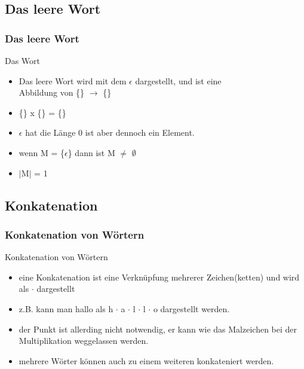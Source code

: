 \documentclass{beamer}
\begin{document}
\subsection{Das leere Wort}
\begin{frame}
	\frametitle{Das leere Wort}
	\begin{block}{Das Wort}
		\begin{itemize}
			\item Das leere Wort wird mit dem $\epsilon$ dargestellt, und ist eine \\
			Abbildung von \{\} $\rightarrow$ \{\} \\
			\item \{\} x \{\} = \{\} \\
			\item $\epsilon$ hat die Länge 0 ist aber dennoch ein Element. \\
			\item wenn M = \{$\epsilon$\} dann ist M $\not=$ $\emptyset$ \\
			\item $|$M$|$ = 1
		\end{itemize}
	\end{block}
\end{frame}

\subsection{Konkatenation}
\begin{frame}
	\frametitle{Konkatenation von Wörtern}
	\begin{block}{Konkatenation von Wörtern}
		\begin{itemize}
			\item eine Konkatenation ist eine Verknüpfung mehrerer Zeichen(ketten) 			und wird als $\cdot$ dargestellt \\
			\item z.B. kann man hallo als h $\cdot$ a $\cdot$ l $\cdot$ l $\cdot$ 				o dargestellt werden.\\
			\item der Punkt ist allerding nicht notwendig, er kann wie das 						Malzeichen bei der Multiplikation weggelassen werden. \\
			\item mehrere Wörter können auch zu einem weiteren konkateniert 					werden.
		\end{itemize}
	\end{block}
\end{frame}
\end{document}
